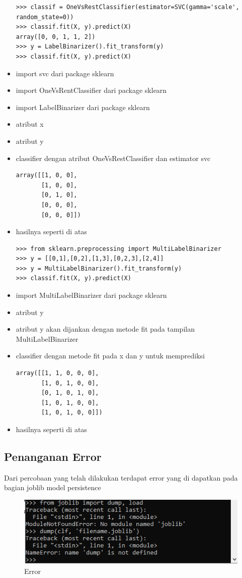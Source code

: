 \begin{itemize}
\begin{verbatim}
>>> classif = OneVsRestClassifier(estimator=SVC(gamma='scale', random_state=0))
>>> classif.fit(X, y).predict(X)
array([0, 0, 1, 1, 2])
>>> y = LabelBinarizer().fit_transform(y)
>>> classif.fit(X, y).predict(X)
\end{verbatim}
\item import svc dari package sklearn
\item import OneVsRentClassifier dari package sklearn
\item import LabelBinarizer dari package sklearn
\item atribut x
\item atribut y
\item classifier dengan atribut OneVsRestClassifier dan estimator svc
\begin{verbatim}
array([[1, 0, 0],
       [1, 0, 0],
       [0, 1, 0],
       [0, 0, 0],
       [0, 0, 0]])
\end{verbatim}
\item hasilnya seperti di atas
\begin{verbatim}
>>> from sklearn.preprocessing import MultiLabelBinarizer
>>> y = [[0,1],[0,2],[1,3],[0,2,3],[2,4]]
>>> y = MultiLabelBinarizer().fit_transform(y)
>>> classif.fit(X, y).predict(X)
\end{verbatim}
\item import MultiLabelBinarizer dari package sklearn
\item atribut y
\item atribut y akan dijankan dengan metode fit pada tampilan MultiLabelBinarizer
\item classifier dengan metode fit pada x dan y untuk memprediksi 
\begin{verbatim}
array([[1, 1, 0, 0, 0],
       [1, 0, 1, 0, 0],
       [0, 1, 0, 1, 0],
       [1, 0, 1, 0, 0],
       [1, 0, 1, 0, 0]])
\end{verbatim}
\item hasilnya seperti di atas
\end{itemize}

\subsection{Penanganan Error}
Dari percobaan yang telah dilakukan terdapat error yang di dapatkan pada bagian joblib model persistence

\begin{figure}[ht]
\centering
\includegraphics[scale=0.5]{figures/i20.png}
\caption{Error}
\end{figure}

